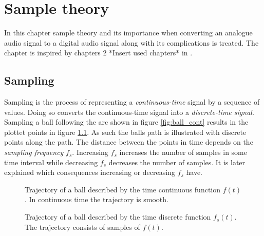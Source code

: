 \chapter{Sample theory} \label{ch4}
In this chapter sample theory and its importance when converting an analogue audio signal to a digital audio signal along with its complications is treated. The chapter is inspired by chapters 2 *Insert used chapters* in \cite{pelgrom}.
\section{Sampling}
Sampling is the process of representing a \textit{continuous-time} signal by a sequence of values. Doing so converts the continuous-time signal into a \textit{discrete-time signal}. \cite{pelgrom} Sampling a ball following the arc shown in figure \ref{fig:ball_cont} results in the plottet points in figure \ref{fig:ball_disc}. As such the balls path is illustrated with discrete points along the path. The distance between the points in time depends on the \textit{sampling frequency} $f_s$. Increasing $f_s$ increases the number of samples in some time interval while decreasing $f_s$ decreases the number of samples. It is later explained which consequences increasing or decreasing $f_s$ have.
\begin{figure}[H]
\centering
\begin{minipage}{0.49\textwidth}
\centering
{}
\caption{Trajectory of a ball described by the time continuous function $f(t)$. In continuous time the trajectory is smooth.}
\label{fig:ball_cont}
\end{minipage}
\centering
\begin{minipage}{0.49\textwidth}
\centering
{}
\caption{Trajectory of a ball described by the time discrete function $f_s(t)$. The trajectory consists of samples of $f(t)$.}
\label{fig:ball_disc}
\end{minipage}
\end{figure}
